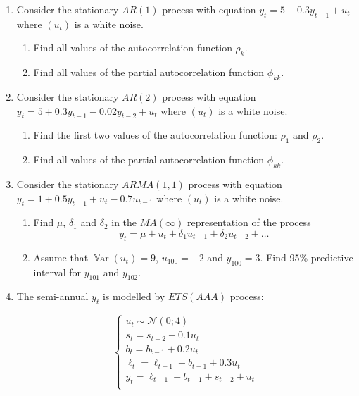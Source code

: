 \documentclass[12pt]{article}
\DeclareMathOperator{\Var}{\mathbb{V}ar}
\newcommand \cN{\mathcal{N}}
\begin{document}
\begin{enumerate}


\item Consider the stationary $AR(1)$ process with equation $y_t = 5 + 0.3y_{t-1} + u_t$ where $(u_t)$ is a white noise.
\begin{enumerate}
  \item Find all values of the autocorrelation function $\rho_k$.
  \item Find all values of the partial autocorrelation function $\phi_{kk}$.
\end{enumerate}

\item Consider the stationary $AR(2)$ process with equation $y_t = 5 + 0.3y_{t-1} - 0.02 y_{t-2} + u_t$ 
where $(u_t)$ is a white noise. 
\begin{enumerate}
  \item Find the first two values of the autocorrelation function: $\rho_1$ and $\rho_2$.
  \item Find all values of the partial autocorrelation function $\phi_{kk}$.
\end{enumerate}

\item Consider the stationary $ARMA(1, 1)$ process with equation $y_t = 1 + 0.5 y_{t-1} + u_t - 0.7 u_{t-1}$ where $(u_t)$ is a white noise. 
\begin{enumerate}
  \item Find $\mu$, $\delta_1$ and $\delta_2$ in the $MA(\infty)$ representation of the process
  \[
  y_t = \mu + u_t + \delta_1 u_{t-1} + \delta_2 u_{t-2} + \ldots  
  \]
  \item Assume that $\Var(u_t) = 9$, $u_{100} = -2$ and $y_{100} = 3$.
  Find 95\% predictive interval for $y_{101}$ and $y_{102}$.
\end{enumerate}

\item The semi-annual $y_t$ is modelled by $ETS(AAA)$ process:
    
\[
\begin{cases}
    u_t \sim \cN(0; 4) \\
    s_t = s_{t-2} + 0.1 u_t \\
    b_t = b_{t-1} + 0.2 u_t \\
    \ell_t = \ell_{t-1} + b_{t-1} + 0.3 u_t \\
    y_t = \ell_{t-1} + b_{t-1} + s_{t-2} + u_t \\
\end{cases}    
\]


\end{enumerate}
\end{document}
